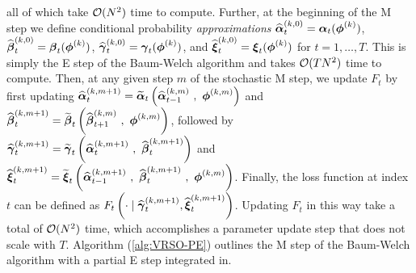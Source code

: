 all of which take $\mathcal{O}(N^2)$ time to compute. Further, at the beginning of the M step we define conditional probability \textit{approximations} $\widehat {\boldsymbol{\alpha}}_{t}^{(k,0)} = \boldsymbol{\alpha}_t(\boldsymbol{\phi}^{(k)})$, $\widehat {\boldsymbol{\beta}}_{t}^{(k,0)} = \boldsymbol{\beta}_t(\boldsymbol{\phi}^{(k)})$, $\widehat {\boldsymbol{\gamma}}_{t}^{(k,0)} = \boldsymbol{\gamma}_t(\boldsymbol{\phi}^{(k)})$, and $\widehat {\boldsymbol{\xi}}_{t}^{(k,0)} = \boldsymbol{\xi}_t(\boldsymbol{\phi}^{(k)})$ for $t = 1,\ldots,T$. This is simply the E step of the Baum-Welch algorithm and takes $\mathcal{O}(TN^2)$ time to compute. Then, at any given step $m$ of the stochastic M step, we update $F_{t}$ by first updating $\widehat {\boldsymbol{\alpha}}_{t}^{(k,m+1)} = \widetilde {\boldsymbol{\alpha}}_{t}\left(\widehat {\boldsymbol{\alpha}}_{t-1}^{(k,m)} ~,~ \boldsymbol{\phi}^{(k,m)}\right)$ and $\widehat {\boldsymbol{\beta}}_{t}^{(k,m+1)} = \widetilde {\boldsymbol{\beta}}_{t}\left(\widehat {\boldsymbol{\beta}}_{t+1}^{(k,m)} ~,~ \boldsymbol{\phi}^{(k,m)}\right)$, followed by $\widehat {\boldsymbol{\gamma}}_{t}^{(k,m+1)} = \widetilde {\boldsymbol{\gamma}}_{t}\left(\widehat {\boldsymbol{\alpha}}_{t}^{(k,m+1)} ~,~ \widehat {\boldsymbol{\beta}}_{t}^{(k,m+1)}\right)$ and $\widehat {\boldsymbol{\xi}}_{t}^{(k,m+1)} = \widetilde {\boldsymbol{\xi}}_{t}\left(\widehat {\boldsymbol{\alpha}}_{t-1}^{(k,m+1)} ~,~ \widehat {\boldsymbol{\beta}}_{t}^{(k,m+1)} ~,~ \boldsymbol{\phi}^{(k,m)}\right)$. Finally, the loss function at index $t$ can be defined as $F_{t}\left(\cdot \mid \widehat {\boldsymbol{\gamma}}_{t}^{(k,m+1)},\widehat {\boldsymbol{\xi}}_{t}^{(k,m+1)}\right)$. Updating $F_{t}$ in this way take a total of $\mathcal{O}(N^2)$ time, which accomplishes a parameter update step that does not scale with $T$. Algorithm (\ref{alg:VRSO-PE}) outlines the M step of the Baum-Welch algorithm with a partial E step integrated in. %



